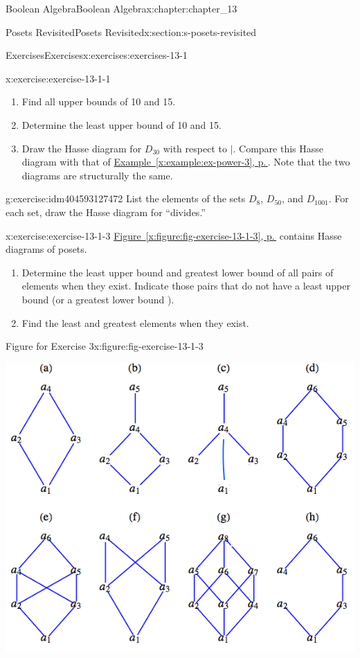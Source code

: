 \documentclass[twoside,10pt,]{book}
\newcommand{\xreffont}{\relax}
\numberwithin{equation}{section}
\begin{document}
\begin{chapterptx}{Boolean Algebra}{}{Boolean Algebra}{}{}{x:chapter:chapter_13}
\begin{sectionptx}{Posets Revisited}{}{Posets Revisited}{}{}{x:section:s-posets-revisited}
\begin{exercises-subsection}{Exercises}{}{Exercises}{}{}{x:exercises:exercises-13-1}
\begin{divisionexercise}{1}{}{}{x:exercise:exercise-13-1-1}
\begin{enumerate}[label=(\alph*)]
\item{}Find all upper bounds of 10 and 15.%
\item{}Determine the least upper bound  of 10 and 15.%
\item{}Draw the Hasse diagram for \(D_{30}\) with respect to \(\mid\). Compare this Hasse diagram with that of \hyperref[x:example:ex-power-3]{Example~{\xreffont\ref{x:example:ex-power-3}}, p.\,\pageref{x:example:ex-power-3}}. Note that the two diagrams are structurally the same.%
\end{enumerate}
%
\end{divisionexercise}%
\begin{divisionexercise}{2}{}{}{g:exercise:idm404593127472}%
List the elements of the sets \(D_8\), \(D_{50}\), and \(D_{1001}\). For each set, draw the Hasse diagram for ``divides.''%
\end{divisionexercise}%
\begin{divisionexercise}{3}{}{}{x:exercise:exercise-13-1-3}%
\hyperref[x:figure:fig-exercise-13-1-3]{Figure~{\xreffont\ref{x:figure:fig-exercise-13-1-3}}, p.\,\pageref{x:figure:fig-exercise-13-1-3}} contains Hasse diagrams of posets.%
\begin{enumerate}[label=(\alph*)]
\item{}Determine the least upper bound  and greatest lower bound  of all pairs of elements when they exist. Indicate those pairs that do not have a least upper bound  (or a greatest lower bound ).%
\item{}Find the least and greatest elements when they exist.%
\end{enumerate}
%
\begin{figureptx}{Figure for Exercise 3}{x:figure:fig-exercise-13-1-3}{}%
\begin{image}{0.1}{0.8}{0.1}%
\includegraphics[width=\linewidth]{images/fig-exercise-13-1-3.png}

\end{image}
\end{figureptx}
\end{divisionexercise}
\end{exercises-subsection}
\end{sectionptx}
\end{chapterptx}
\end{document}
